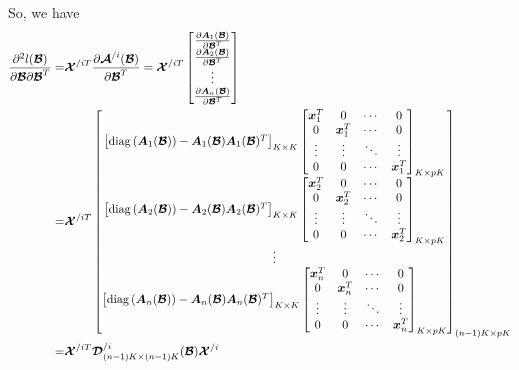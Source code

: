 \documentclass[letter]{article}
\begin{document}
	So, we have
	$$\begin{aligned}
	\frac{\partial^2l(\bm{\mathcal{B}})}{\partial\bm{\mathcal{B}}\partial\bm{\mathcal{B}}^T}=&\bm{\mathcal{X}}^{/iT}\frac{\partial \bm{\mathcal{A}}^{/i}(\bm{\mathcal{B}})}{\partial\bm{\mathcal{B}}^T}=
	\bm{\mathcal{X}}^{/iT}\begin{bmatrix}
	\frac{\partial \bm{A}_1(\bm{\mathcal{B}})}{\partial\bm{\mathcal{B}}^T} \\
	\frac{\partial \bm{A}_2(\bm{\mathcal{B}})}{\partial\bm{\mathcal{B}}^T} \\
	\vdots \\
	\frac{\partial \bm{A}_n(\bm{\mathcal{B}})}{\partial\bm{\mathcal{B}}^T} \\
	\end{bmatrix} \\
	=&\bm{\mathcal{X}}^{/iT}
	\begin{bmatrix}
	\left[{\rm diag}\left(\bm{A}_1(\bm{\mathcal{B}})\right)-\bm{A}_1(\bm{\mathcal{B}})\bm{A}_1(\bm{\mathcal{B}})^T\right]_{K\times K}
	\begin{bmatrix}
	\bm{x}_1^T & 0 & \cdots & 0 \\
	0 & \bm{x}_1^T & \cdots & 0 \\
	\vdots & \vdots & \ddots & \vdots \\
	0 & 0 & \cdots & \bm{x}_1^T \\
	\end{bmatrix}_{K\times pK} \\
	\left[{\rm diag}\left(\bm{A}_2(\bm{\mathcal{B}})\right)-\bm{A}_2(\bm{\mathcal{B}})\bm{A}_2(\bm{\mathcal{B}})^T\right]_{K\times K}
	\begin{bmatrix}
	\bm{x}_2^T & 0 & \cdots & 0 \\
	0 & \bm{x}_2^T & \cdots & 0 \\
	\vdots & \vdots & \ddots & \vdots \\
	0 & 0 & \cdots & \bm{x}_2^T \\
	\end{bmatrix}_{K\times pK} \\
	\vdots \\
	\left[{\rm diag}\left(\bm{A}_n(\bm{\mathcal{B}})\right)-\bm{A}_n(\bm{\mathcal{B}})\bm{A}_n(\bm{\mathcal{B}})^T\right]_{K\times K}
	\begin{bmatrix}
	\bm{x}_n^T & 0 & \cdots & 0 \\
	0 & \bm{x}_n^T & \cdots & 0 \\
	\vdots & \vdots & \ddots & \vdots \\
	0 & 0 & \cdots & \bm{x}_n^T \\
	\end{bmatrix}_{K\times pK} \\
	\end{bmatrix}_{(n-1)K\times pK} \\
	=&\bm{\mathcal{X}}^{/iT}
	\bm{\mathcal{D}}_{(n-1)K\times (n-1)K}^{/i}(\bm{\mathcal{B}})\bm{\mathcal{X}}^{/i} \\
	\end{aligned}$$
	
\end{document}
